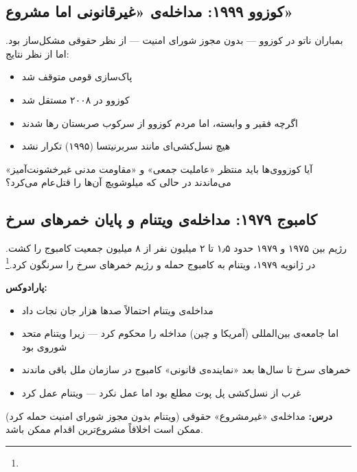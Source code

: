 \subsection{کوزوو ۱۹۹۹: مداخله‌ی «غیرقانونی اما مشروع»}
\label{subsec:ch15-kosovo-success}

بمباران ناتو در کوزوو — بدون مجوز شورای امنیت — از نظر حقوقی مشکل‌ساز بود. اما از نظر نتایج:

\begin{itemize}
\item پاک‌سازی قومی متوقف شد
\item کوزوو در ۲۰۰۸ مستقل شد
\item اگرچه فقیر و وابسته، اما مردم کوزوو از سرکوب صربستان رها شدند
\item هیچ نسل‌کشی‌ای مانند سربرنیتسا (۱۹۹۵) تکرار نشد
\end{itemize}

آیا کوزووی‌ها باید منتظر «عاملیت جمعی» و «مقاومت مدنی غیرخشونت‌آمیز» می‌ماندند در حالی که میلوشویچ آن‌ها را قتل‌عام می‌کرد؟

\subsection{کامبوج ۱۹۷۹: مداخله‌ی ویتنام و پایان خمرهای سرخ}
\label{subsec:ch15-cambodia}

\begin{tcolorbox}[casebox, title={مطالعه‌ی موردی: کامبوج — مداخله‌ای که جان نجات داد}]
رژیم  بین ۱۹۷۵ و ۱۹۷۹ حدود ۱٫۵ تا ۲ میلیون نفر از ۸ میلیون جمعیت کامبوج را کشت. در ژانویه ۱۹۷۹، ویتنام به کامبوج حمله و رژیم خمرهای سرخ را سرنگون کرد.\footnote{}

\textbf{پارادوکس:}
\begin{itemize}
\item مداخله‌ی ویتنام احتمالاً صدها هزار جان نجات داد
\item اما جامعه‌ی بین‌المللی (آمریکا و چین) مداخله را محکوم کرد — زیرا ویتنام متحد شوروی بود
\item خمرهای سرخ تا سال‌ها بعد «نماینده‌ی قانونی» کامبوج در سازمان ملل باقی ماندند
\item غرب از نسل‌کشی پل پوت مطلع بود اما عمل نکرد — ویتنام عمل کرد
\end{itemize}

\textbf{درس:} مداخله‌ی «غیرمشروع» حقوقی (ویتنام بدون مجوز شورای امنیت حمله کرد) ممکن است اخلاقاً مشروع‌ترین اقدام ممکن باشد.
\end{tcolorbox}


